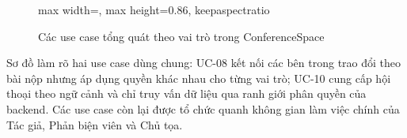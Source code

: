 \begin{figure}[H]
\begin{adjustbox}{max width=\textwidth, max height=0.86\textheight, keepaspectratio}
  \end{adjustbox}
  \caption{Các use case tổng quát theo vai trò trong ConferenceSpace}
  \label{fig:ch3-usecase-map-cut}
\end{figure}

Sơ đồ làm rõ hai use case dùng chung: UC-08 kết nối các bên trong trao đổi theo bài nộp nhưng áp dụng quyền khác nhau cho từng vai trò; UC-10 cung cấp hội thoại theo ngữ cảnh và chỉ truy vấn dữ liệu qua ranh giới phân quyền của backend. Các use case còn lại được tổ chức quanh không gian làm việc chính của Tác giả, Phản biện viên và Chủ tọa.

